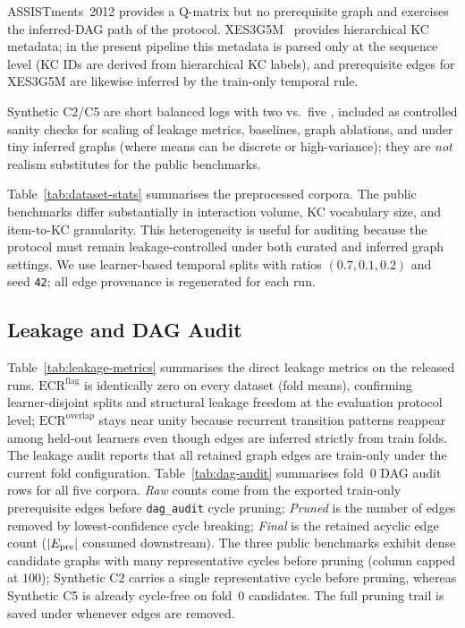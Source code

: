 ASSISTments~2012 provides a Q-matrix but no prerequisite graph and
exercises the inferred-DAG path of the protocol. XES3G5M~\cite{xes3g5m2023}
provides hierarchical KC metadata; in the present pipeline this metadata
is parsed only at the sequence level (KC IDs are derived from
hierarchical KC labels), and prerequisite edges for XES3G5M are likewise
inferred by the train-only temporal rule.

Synthetic C2/C5 are short balanced logs with two vs.\ five \KCs{},
included as controlled sanity checks for scaling of leakage metrics,
baselines, graph ablations, and \DDR{} under tiny inferred graphs (where means can be discrete or high-variance); they are \emph{not} realism substitutes for the public benchmarks.

Table~\ref{tab:dataset-stats} summarises the preprocessed corpora.
The public benchmarks differ substantially in interaction volume, KC
vocabulary size, and item-to-KC granularity. This heterogeneity is
useful for auditing because the protocol must remain leakage-controlled
under both curated and inferred graph settings. We use learner-based
temporal splits with ratios $(0.7,0.1,0.2)$ and seed \texttt{42}; all
edge provenance is regenerated for each run.
\subsection{Leakage and DAG Audit}
\label{sec:exp-audit}


Table~\ref{tab:leakage-metrics} summarises the direct leakage metrics on
the released runs. $\mathrm{ECR}^{\mathrm{flag}}$ is identically zero on every dataset (fold means), confirming learner-disjoint splits and structural leakage freedom at the evaluation protocol level; $\mathrm{ECR}^{\mathrm{overlap}}$ stays near unity because recurrent transition patterns reappear among held-out learners even though edges are inferred strictly from train folds.
The leakage audit reports that all retained graph edges are train-only
under the current fold configuration. Table~\ref{tab:dag-audit} summarises fold~0 DAG audit rows for all five corpora.
\emph{Raw} counts come from the exported train-only prerequisite edges before \texttt{dag\_audit} cycle pruning; \emph{Pruned} is the number of edges removed by lowest-confidence cycle breaking; \emph{Final} is the retained acyclic edge count ($|E_{\text{pre}}|$ consumed downstream).
The three public benchmarks exhibit dense candidate graphs with many representative cycles before pruning (column capped at $100$); Synthetic C2 carries a single representative cycle before pruning, whereas Synthetic C5 is already cycle-free on fold~0 candidates.
The full pruning trail is saved under  whenever edges are removed.

